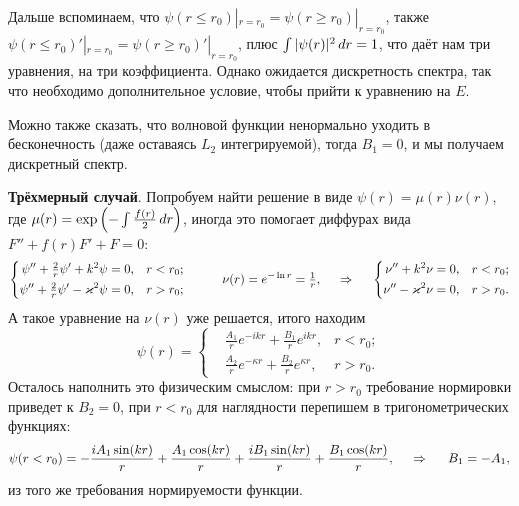 Дальше вспоминаем, что $\psi(r \leq r_0) |_{r=r_0} = \psi(r \geq r_0) |_{r=r_0}$, также $\psi(r \leq r_0)' |_{r=r_0} = \psi(r \geq r_0)' |_{r=r_0}$, плюс $\int |\psi(r)|^2 \, d r = 1$, что даёт нам три уравнения, на три коэффициента. Однако ожидается дискретность спектра, так что необходимо дополнительное условие, чтобы прийти к уравнению на $E$. 

Можно также сказать, что волновой функции ненормально уходить в бесконечность (даже оставаясь $L_2$ интегрируемой), тогда $B_1 = 0$, и мы получаем дискретный спектр. 

% 


















\textbf{Трёхмерный случай}. Попробуем найти решение в виде $\psi(r) = \mu(r) \nu(r)$, где $\mu(r) = \exp\left(
    - \int \frac{f(r)}{2} \, d r
\right)$, иногда это помогает диффурах вида $F'' + f(r) F' + F = 0$:
\begin{equation*}
    \left\{\begin{aligned}
        \psi'' + \tfrac{2}{r} \psi' + k^2 \psi &= 0,  &r < r_0; \\
        \psi'' + \tfrac{2}{r} \psi' - \kappa^2 \psi &= 0, &r > r_0;
    \end{aligned}\right.
    \hspace{10 mm} 
    \nu(r) = e^{- \ln r} = \tfrac{1}{r},
    \hspace{0.5cm} \Rightarrow \hspace{0.5cm}
    \left\{\begin{aligned}
         \nu'' + k^2 \nu &= 0,  &r < r_0; \\
         \nu'' - \kappa^2 \nu &= 0, &r > r_0.
    \end{aligned}\right.
\end{equation*}
А такое уравнение на $\nu(r)$ уже решается, итого находим
\begin{equation*}
    \psi(r) = \left\{\begin{aligned}
        &\tfrac{A_1}{r} e^{- i k r} + \tfrac{B_1}{r} e^{i k r}, &r<r_0; \\
        &\tfrac{A_2}{r} e^{- \kappa r} + \tfrac{B_2}{r} e^{\kappa r}, &r>r_0.
    \end{aligned}\right.
\end{equation*}
Осталось наполнить это физическим смыслом: при $r > r_0$ требование нормировки приведет к $B_2 = 0$, при $r < r_0$ для наглядности перепишем в тригонометрических функциях:
\begin{equation*}
    \psi(r < r_0) = -\frac{i A_1 \sin (k r)}{r}+\frac{A_1 \cos (k r)}{r}+\frac{i B_1 \sin (k r)}{r}+\frac{B_1 \cos (k r)}{r},
    \hspace{0.5cm} \Rightarrow \hspace{0.5cm}
    B_1 = -A_1,
\end{equation*}
из того же требования нормируемости функции. 

